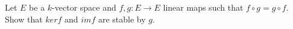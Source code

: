 Let $E$ be a $k$-vector space and $f, g: E \to E$ linear maps such that $f \circ g = g \circ f$. Show that $ker f$ and $im f$ are stable by $g$.
